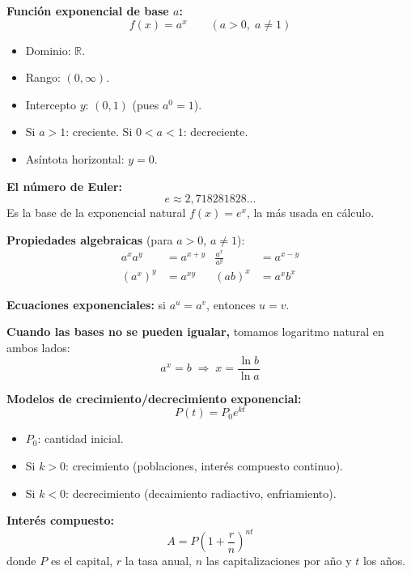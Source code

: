 \documentclass[12pt, a4paper]{article}
\begin{document}
\begin{cuadroteoria}
  \textbf{Función exponencial de base $a$:}
  $$f(x) = a^x \qquad (a > 0,\; a \neq 1)$$
  \begin{itemize}[leftmargin=*]
    \item Dominio: $\mathbb{R}$.
    \item Rango: $(0, \infty)$.
    \item Intercepto $y$: $(0, 1)$ (pues $a^0 = 1$).
    \item Si $a > 1$: creciente. Si $0 < a < 1$: decreciente.
    \item Asíntota horizontal: $y = 0$.
  \end{itemize}

  \textbf{El número de Euler:}
  $$e \approx 2{,}718281828{\dots}$$
  Es la base de la exponencial natural $f(x) = e^x$, la más usada en cálculo.
\end{cuadroteoria}
\newpage
\begin{cuadrosolucion}
  \textbf{Propiedades algebraicas} (para $a > 0$, $a \neq 1$):
  \begin{align*}
    a^x a^y & = a^{x+y} & \frac{a^x}{a^y} & = a^{x-y} \\
    (a^x)^y & = a^{xy}  & (ab)^x          & = a^x b^x
  \end{align*}

  \textbf{Ecuaciones exponenciales:} si $a^u = a^v$, entonces $u = v$.

  \textbf{Cuando las bases no se pueden igualar,} tomamos logaritmo natural en ambos lados:
  $$a^x = b \;\Longrightarrow\; x = \frac{\ln b}{\ln a}$$
\end{cuadrosolucion}

\begin{cuadroadvertencia}
  \textbf{Modelos de crecimiento/decrecimiento exponencial:}
  $$P(t) = P_0 e^{kt}$$
  \begin{itemize}[leftmargin=*]
    \item $P_0$: cantidad inicial.
    \item Si $k > 0$: crecimiento (poblaciones, interés compuesto continuo).
    \item Si $k < 0$: decrecimiento (decaimiento radiactivo, enfriamiento).
  \end{itemize}

  \textbf{Interés compuesto:}
  $$A = P\left(1 + \frac{r}{n}\right)^{nt}$$
  donde $P$ es el capital, $r$ la tasa anual, $n$ las capitalizaciones por año y $t$ los años.
\end{cuadroadvertencia}
\end{document}
